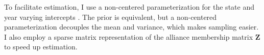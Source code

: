 \documentclass[12pt]{article}
\begin{document}
To facilitate estimation, I use a non-centered parameterization for the state and year varying intercepts \citep{BetancourtGirolani2015}. 
The prior is equivalent, but a non-centered parameterization decouples the mean and variance, which makes sampling easier. 
I also employ a sparse matrix representation of the alliance membership matrix $\textbf{Z}$ to speed up estimation. 


\singlespace


 
\end{document}
